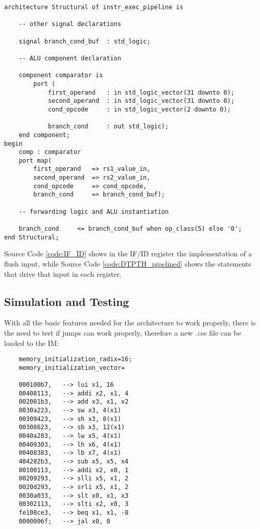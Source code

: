 \begin{verbatim}
architecture Structural of instr_exec_pipeline is
    
    -- other signal declarations

    signal branch_cond_buf  : std_logic;

    -- ALU component declaration
    
    component comparator is
        port ( 
            first_operand   : in std_logic_vector(31 downto 0);
            second_operand  : in std_logic_vector(31 downto 0);
            cond_opcode     : in std_logic_vector(2 downto 0);
            
            branch_cond     : out std_logic);
    end component;
begin
    comp : comparator 
    port map(
        first_operand   => rs1_value_in,
        second_operand  => rs2_value_in,
        cond_opcode     => cond_opcode,
        branch_cond     => branch_cond_buf); 
    
    -- forwarding logic and ALU instantiation
    
    branch_cond     <= branch_cond_buf when op_class(5) else '0';
end Structural;
\end{verbatim}

Source Code \ref{code:IF_ID} shows in the IF/ID register the implementation of a flush input, while Source Code \ref{code:DTPTH_pipelined} shows the statements that drive that input in each register.

\subsection{Simulation and Testing}
With all the basic features needed for the architecture to work properly, there is the need to test if jumps can work properly, therefore a new \emph{.coe} file can be loaded to the IM:

\begin{verbatim}
    memory_initialization_radix=16;
    memory_initialization_vector=

    000100b7,   --> lui x1, 16
    00408113,   --> addi x2, x1, 4
    002081b3,   --> add x3, x1, x2
    0030a223,   --> sw x3, 4(x1)
    00309423,   --> sh x3, 8(x1)
    00308623,   --> sb x3, 12(x1)
    0040a283,   --> lw x5, 4(x1)
    00409303,   --> lh x6, 4(x1) 
    00408383,   --> lb x7, 4(x1)
    404282b3,   --> sub x5, x5, x4
    00100113,   --> addi x2, x0, 1
    00209293,   --> slli x5, x1, 2
    0020d293,   --> srli x5, x1, 2
    0030a033,   --> slt x0, x1, x3
    00302113,   --> slti x2, x0, 3
    fe108ce3,   --> beq x1, x1, -8      
    0000006f;   --> jal x0, 0           
\end{verbatim}


